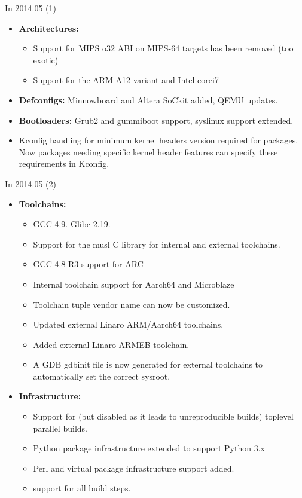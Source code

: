 \begin{frame}{In 2014.05 (1)}
  \begin{itemize}
  \item {\bf Architectures:}
    \begin{itemize}
    \item Support for MIPS o32 ABI on MIPS-64 targets has
      been removed (too exotic)
    \item Support for the ARM A12 variant and Intel corei7
    \end{itemize}
  \item {\bf Defconfigs:} Minnowboard and Altera SoCkit added, QEMU
    updates.
  \item {\bf Bootloaders:} Grub2 and gummiboot support, syslinux
    support extended.
  \item Kconfig handling for minimum kernel headers version required
    for packages. Now packages needing specific kernel header features
    can specify these requirements in Kconfig.
  \end{itemize}
\end{frame}

\begin{frame}{In 2014.05 (2)}
  \begin{itemize}
  \item {\bf Toolchains:}
    \begin{itemize}
    \item GCC 4.9. Glibc 2.19.
    \item Support for the musl C
      library for internal and external toolchains.
    \item GCC 4.8-R3 support for ARC
    \item Internal toolchain support for Aarch64 and
      Microblaze
    \item Toolchain tuple vendor name can now be
      customized.
    \item Updated external Linaro ARM/Aarch64
      toolchains.
    \item Added external Linaro ARMEB toolchain.
    \item A GDB gdbinit file is now generated for external toolchains
      to automatically set the correct sysroot.
    \end{itemize}
  \item {\bf Infrastructure:}
    \begin{itemize}
    \item Support for (but disabled as it leads to
      unreproducible builds) toplevel parallel builds.
    \item Python package infrastructure extended to support Python 3.x
    \item Perl and virtual package infrastructure support added.
    \item {} support for all build steps.
    \end{itemize}
  \end{itemize}
\end{frame}

